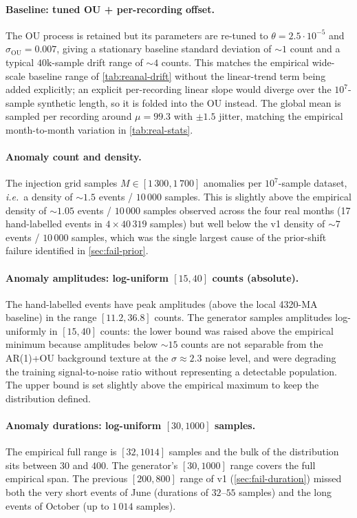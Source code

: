 \paragraph{Baseline: tuned OU + per-recording offset.}
The OU process is retained but its parameters are re-tuned to
$\theta = 2.5 \cdot 10^{-5}$ and $\sigma_{\mathrm{OU}} = 0.007$, giving
a stationary baseline standard deviation of $\sim 1$ count and a
typical $40\text{k}$-sample drift range of $\sim 4$ counts. This
matches the empirical wide-scale baseline range of
\cref{tab:reanal-drift} without the linear-trend term being added
explicitly; an explicit per-recording linear slope would diverge over
the $10^7$-sample synthetic length, so it is folded into the OU instead.
The global mean is sampled per recording around $\mu = 99.3$ with
$\pm 1.5$ jitter, matching the empirical month-to-month variation in
\cref{tab:real-stats}.

\paragraph{Anomaly count and density.}
The injection grid samples $M \in [1\,300, 1\,700]$ anomalies per
$10^{7}$-sample dataset, \emph{i.e.}\ a density of
$\sim 1.5$ events / $10\,000$ samples. This is slightly above the
empirical density of $\sim 1.05$ events / $10\,000$ samples observed
across the four real months (17 hand-labelled events in
$4 \times 40\,319$ samples) but well below the v1 density of $\sim 7$
events / $10\,000$ samples, which was the single largest cause of the
prior-shift failure identified in \cref{sec:fail-prior}.

\paragraph{Anomaly amplitudes: log-uniform $[15, 40]$ counts (absolute).}
The hand-labelled events have peak amplitudes (above the local 4320-MA
baseline) in the range $[11.2, 36.8]$ counts. The generator samples
amplitudes log-uniformly in $[15, 40]$ counts: the lower bound was
raised above the empirical minimum because amplitudes below $\sim 15$
counts are not separable from the AR(1)+OU background texture at the
$\sigma \approx 2.3$ noise level, and were degrading the training
signal-to-noise ratio without representing a detectable population.
The upper bound is set slightly above the empirical maximum to keep
the distribution defined.

\paragraph{Anomaly durations: log-uniform $[30, 1000]$ samples.}
The empirical full range is $[32, 1014]$ samples and the bulk of the
distribution sits between $30$ and $400$. The generator's $[30, 1000]$
range covers the full empirical span. The previous $[200, 800]$ range
of v1 (\cref{sec:fail-duration}) missed both the very short events of
June (durations of $32$--$55$ samples) and the long events of October
(up to $1\,014$ samples).

